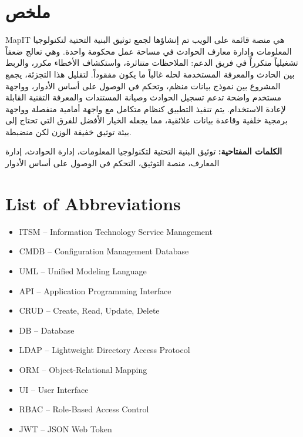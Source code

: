 \documentclass[12pt,a4paper]{report}
\begin{document}
\clearpage

\chapter*{\texorpdfstring{\hfill\textarabic{ملخص}}{ملخص}}
\begin{Arabic}
MapIT هي منصة قائمة على الويب تم إنشاؤها لجمع توثيق البنية التحتية لتكنولوجيا المعلومات وإدارة معارف الحوادث في مساحة عمل محكومة واحدة. وهي تعالج ضعفاً تشغيلياً متكرراً في فريق الدعم: الملاحظات متناثرة، واستكشاف الأخطاء مكرر، والربط بين الحادث والمعرفة المستخدمة لحله غالباً ما يكون مفقوداً. لتقليل هذا التجزئة، يجمع المشروع بين نموذج بيانات منظم، وتحكم في الوصول على أساس الأدوار، وواجهة مستخدم واضحة تدعم تسجيل الحوادث وصيانة المستندات والمعرفة التقنية القابلة لإعادة الاستخدام. يتم تنفيذ التطبيق كنظام متكامل مع واجهة أمامية منفصلة وواجهة برمجية خلفية وقاعدة بيانات علائقية، مما يجعله الخيار الأفضل للفرق التي تحتاج إلى بيئة توثيق خفيفة الوزن لكن منضبطة.

\textbf{الكلمات المفتاحية:} توثيق البنية التحتية لتكنولوجيا المعلومات، إدارة الحوادث، إدارة المعارف، منصة التوثيق، التحكم في الوصول على أساس الأدوار
\end{Arabic}
\chapter*{List of Abbreviations}
\begin{itemize}[leftmargin=2cm]
    \item ITSM -- Information Technology Service Management
    \item CMDB -- Configuration Management Database
    \item UML -- Unified Modeling Language
    \item API -- Application Programming Interface
    \item CRUD -- Create, Read, Update, Delete
    \item DB -- Database
    \item LDAP -- Lightweight Directory Access Protocol
    \item ORM -- Object-Relational Mapping
    \item UI -- User Interface
    \item RBAC -- Role-Based Access Control
    \item JWT -- JSON Web Token
\end{itemize}
\end{document}
